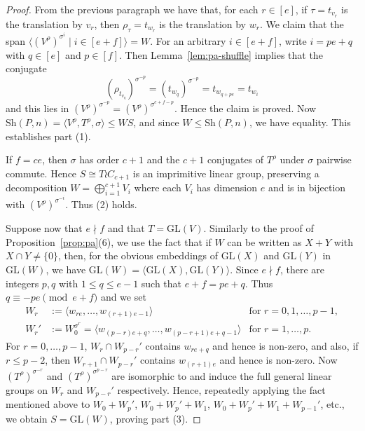 \documentclass[12pt]{amsart}
\theoremstyle{remark}
\theoremstyle{definition}
\newcounter{claim}[thm]
\newcommand{\sh}{\mathrm{Sh}}
\newcommand{\GL}{\mathrm{GL}}
\begin{document}
\begin{proof}
From the previous paragraph we have that, for each $r\in [e]$, if $\tau=t_{v_r}$ is the translation by $v_r$, then $\rho_{\tau}=t_{w_r}$ is the translation by $w_r$. We claim that the span $ \langle (V^{\rho})^{\sigma^i} \mid i\in [e+f] \rangle = W$. 
 For an arbitrary $i \in [e+f]$, write $i = pe+q$ with $q\in [e]$ and $p\in [f]$. Then Lemma~\ref{lem:pa-shuffle} implies that the conjugate
 \[
 (\rho_{t_{v_q}})^{\sigma^{-p}}=(t_{w_q})^{\sigma^{-p}} = t_{w_{q+pe}}= t_{w_{i}}
 \]
and this lies in $(V^\rho)^{\sigma^{-p}}=(V^\rho)^{\sigma^{e+f-p}}$. Hence the claim is proved. Now $\sh(P,n) = \langle V^\rho, T^\rho, \sigma \rangle \leqslant W S$,  and since $W \leqslant \sh(P,n)$, we have equality. This establishes part (1).

If $f=ce$, then $\sigma$ has order $c+1$ and the $c+1$ conjugates of $T^\rho$ under $\sigma$ pairwise commute. Hence $S \cong T \wr C_{c+1}$ is an imprimitive linear group, preserving a decomposition $W=\bigoplus_{i=1}^{c+1} V_i$ where each $V_i$ has dimension $e$ and is in bijection with $(V^\rho)^{\sigma^{-i}}$. Thus (2) holds.

Suppose now that $e \nmid f$ and that $T=\GL(V)$. Similarly to the proof of Proposition~\ref{prop:pa}(6), we use the fact that if $W$ can be written as $X+Y$ with $X \cap Y \neq \{0\}$, then, for the obvious embeddings of $\GL(X)$ and $\GL(Y)$ in  $\GL(W)$, we have $\GL(W) = \langle \GL(X), \GL(Y) \rangle$.  Since $e\nmid f$, there are integers $p, q$ with $1 \leqslant q \leqslant  e-1 $ such that  $e+f=pe+q$. Thus $q \equiv -pe \pmod{e+f}$ and we set 
$$
\begin{array}{cll} 
W_r &:= \langle w_{re}, \dots, w_{(r+1)e-1} \rangle  & \text{for }  r=0,1,\dots, p-1,\\
W_r' &:= W_0^{\sigma^{r}} = \langle w_{(p-r)e+q},\dots,w_{(p-r+1)e+q-1} \rangle  & \text{for }  r=1,\dots,p.
\end{array}
$$
For $r=0,\dots, p-1$, $W_r \cap W_{p-r}' $ contains $w_{re+q}$ and hence is non-zero,  and also, if $r\leqslant p-2$, then  
$W_{r+1} \cap W_{p-r}' $ contains $w_{(r+1)e}$ and hence is non-zero.  Now
 $(T^\rho)^{\sigma^{-r}}$ and $(T^\rho)^{\sigma^{p-r}}$ are isomorphic to and induce the full general linear groups on $W_r$ and $W_{p-r}'$ respectively. Hence, repeatedly applying the fact mentioned above to $W_0+W_p'$, $W_0+W_p' + W_1$, $W_0 + W_p'+W_1+W_{p-1}'$, etc., 
 we obtain $S = \GL(W)$, proving part (3).
\end{proof}
\end{document}
